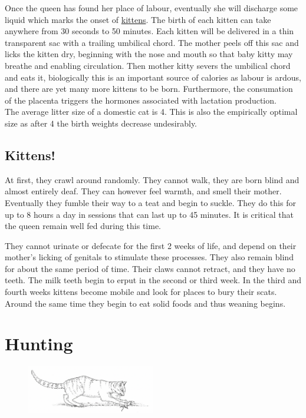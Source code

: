\documentclass{article}
\begin{document}
\noindent{}Once the queen has found her place of labour, eventually she will discharge some liquid which marks the onset of \hyperref[sec:Kittens]{kittens}. The birth of each kitten can take anywhere from 30 seconds to 50 minutes. Each kitten will be delivered in a thin transparent sac with a trailing umbilical chord. The mother peels off this sac and licks the kitten dry, beginning with the nose and mouth so that baby kitty may breathe and enabling circulation. Then mother kitty severs the umbilical chord and eats it, biologically this is an important source of calories as labour is ardous, and there are yet many more kittens to be born. Furthermore, the consumation of the placenta triggers the hormones associated with lactation production.\\

The average litter size of a domestic cat is 4. This is also the empirically optimal size as after 4 the birth weights decrease undesirably.


\subsection*{Kittens!}
\label{sec:Kittens}
At first, they crawl around randomly. They cannot walk, they are born blind and almost entirely deaf. They can however feel warmth, and smell their mother. Eventually they fumble their way to a teat and begin to suckle. They do this for up to 8 hours a day in sessions that can last up to 45 minutes. It is critical that the queen remain well fed during this time.

They cannot urinate or defecate for the first 2 weeks of life, and depend on their mother's licking of genitals to stimulate these processes. They also remain blind for about the same period of time. Their claws cannot retract, and they have no teeth. The milk teeth begin to erput in the second or third week. In the third and fourth weeks kittens become mobile and look for places to bury their scats. Around the same time they begin to eat solid foods and thus weaning begins.

\section*{Hunting}

\begin{figure}[h]
    \centering
    \includegraphics[width=0.5\textwidth]{img/cat-hunter.png}
\end{figure}
\end{document}
